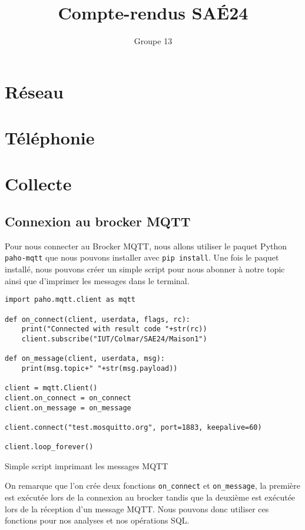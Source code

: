 \documentclass{article}
\author{Groupe 13}
\title{Compte-rendus SAÉ24}
\begin{document}
\maketitle
\tableofcontents
\newpage
\listoffigures
\newpage
\listoflistings

\newpage
\section{Réseau}

\newpage
\section{Téléphonie}

\newpage
\section{Collecte}
    \subsection{Connexion au brocker MQTT}
    Pour nous connecter au Brocker MQTT, nous allons utiliser le paquet Python \verb|paho-mqtt| que nous pouvons installer avec \verb|pip install|. Une fois le paquet installé, nous pouvons créer un simple script pour nous abonner à notre topic ainsi que d'imprimer les messages dans le terminal.

    \begin{listing}[H]
        \begin{verbatim}
import paho.mqtt.client as mqtt

def on_connect(client, userdata, flags, rc):
    print("Connected with result code "+str(rc))
    client.subscribe("IUT/Colmar/SAE24/Maison1")

def on_message(client, userdata, msg):
    print(msg.topic+" "+str(msg.payload))

client = mqtt.Client()
client.on_connect = on_connect
client.on_message = on_message

client.connect("test.mosquitto.org", port=1883, keepalive=60)

client.loop_forever()
        \end{verbatim}
        \caption{Simple script imprimant les messages MQTT}
        \label{mqtt:code-exemple}
    \end{listing}
    On remarque que l'on crée deux fonctions \verb|on_connect| et \verb|on_message|, la première est exécutée lors de la connexion au brocker tandis que la deuxième est exécutée lors de la réception d'un message MQTT. 
    Nous pouvons donc utiliser ces fonctions pour nos analyses et nos opérations SQL.
\end{document}
